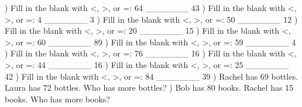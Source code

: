 \documentclass{article}%
\begin{document}
\newline%
) Fill in the blank with <, >, or =: 64 \_\_\_\_\_\_\_ 43%
\newline%
\newline%
) Fill in the blank with <, >, or =: 4 \_\_\_\_\_\_\_ 3%
\newline%
\newline%
) Fill in the blank with <, >, or =: 50 \_\_\_\_\_\_\_ 12%
\newline%
\newline%
) Fill in the blank with <, >, or =: 20 \_\_\_\_\_\_\_ 15%
\newline%
\newline%
) Fill in the blank with <, >, or =: 60 \_\_\_\_\_\_\_ 89%
\newline%
\newline%
) Fill in the blank with <, >, or =: 59 \_\_\_\_\_\_\_ 4%
\newline%
\newline%
) Fill in the blank with <, >, or =: 76 \_\_\_\_\_\_\_ 16%
\newline%
\newline%
) Fill in the blank with <, >, or =: 44 \_\_\_\_\_\_\_ 16%
\newline%
\newline%
) Fill in the blank with <, >, or =: 25 \_\_\_\_\_\_\_ 42%
\newline%
\newline%
) Fill in the blank with <, >, or =: 84 \_\_\_\_\_\_\_ 39%
\newline%
\newline%
) Rachel has 69 bottles. Laura has 72 bottles. Who has more bottles?%
\newline%
\newline%
) Bob has 80 books. Rachel has 15 books. Who has more books?%
\newline%
\newline%
\newline%
\end{document}
